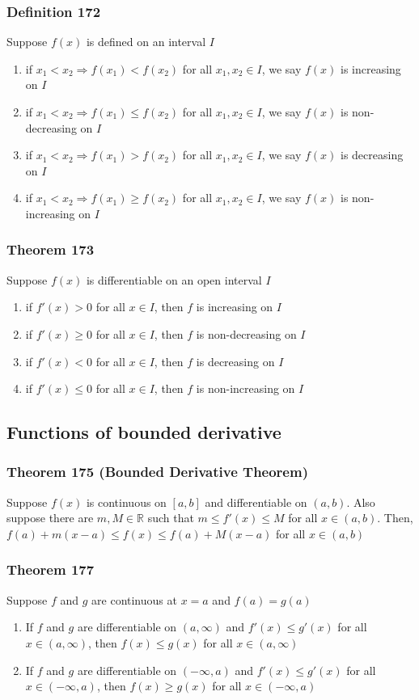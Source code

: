 \documentclass[12pt, letterpaper]{article}
\begin{document}
\subsubsection*{Definition 172}
Suppose $f(x)$ is defined on an interval $I$
\begin{enumerate}
    \item if $x_1 < x_2 \Rightarrow f(x_1) < f(x_2)$ for all $x_1, x_2\in I$, we say $f(x)$ is increasing on $I$
    \item if $x_1 < x_2 \Rightarrow f(x_1) \leq f(x_2)$ for all $x_1, x_2\in I$, we say $f(x)$ is non-decreasing on $I$
    \item if $x_1 < x_2 \Rightarrow f(x_1) > f(x_2)$ for all $x_1, x_2\in I$, we say $f(x)$ is decreasing on $I$
    \item if $x_1 < x_2 \Rightarrow f(x_1) \geq f(x_2)$ for all $x_1, x_2\in I$, we say $f(x)$ is non-increasing on $I$
\end{enumerate}
\subsubsection*{Theorem 173}
Suppose $f(x)$ is differentiable on an open interval $I$
\begin{enumerate}
    \item if $f'(x) > 0$ for all $x\in I$, then $f$ is increasing on $I$
    \item if $f'(x) \geq 0$ for all $x\in I$, then $f$ is non-decreasing on $I$
    \item if $f'(x) < 0$ for all $x\in I$, then $f$ is decreasing on $I$
    \item if $f'(x) \leq 0$ for all $x\in I$, then $f$ is non-increasing on $I$
\end{enumerate}
\subsection{Functions of bounded derivative}
\subsubsection*{Theorem 175 (Bounded Derivative Theorem)}
Suppose $f(x)$ is continuous on $[a,b]$ and differentiable on $(a,b)$. Also suppose there are $m,M\in\mathbb{R}$
such that $m \leq f'(x) \leq M$ for all $x\in(a,b)$. Then, $f(a) + m(x-a) \leq f(x) \leq f(a) + M(x-a)$ for all $x\in(a,b)$
\subsubsection*{Theorem 177}
Suppose $f$ and $g$ are continuous at $x=a$ and $f(a) = g(a)$
\begin{enumerate}
    \item If $f$ and $g$ are differentiable on $(a, \infty)$ and $f'(x) \leq g'(x)$ for all $x\in(a,\infty)$, then $f(x)\leq g(x)$ for all $x\in(a,\infty)$
    \item If $f$ and $g$ are differentiable on $(-\infty, a)$ and $f'(x) \leq g'(x)$ for all $x\in(-\infty, a)$, then $f(x)\geq g(x)$ for all $x\in(-\infty, a)$
\end{enumerate}
\end{document}
